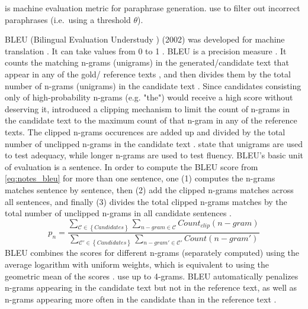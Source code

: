 \bluert{} is machine evaluation metric for paraphrase generation.
\citet{fu_learning_2024} use \bluert{} to filter out incorrect paraphrases (i.e.\ using a threshold $\theta$).

BLEU (Bilingual Evaluation Understudy \citep{palivela_optimization_2021,zhou_paraphrase_2025,papineni_bleu_2001}) (2002) 
was developed for machine translation \citep{zhou_paraphrase_2021,papineni_bleu_2001}.
It can take values from 0 to 1 \citep{papineni_bleu_2001}.
BLEU is a precision measure \citep{kurt_pehlivanoglu_comparative_2024,papineni_bleu_2001}.
It counts the matching n-grams (unigrams) in the generated/candidate text that appear in any of the gold/ reference texts \citep{palivela_optimization_2021,papineni_bleu_2001}, 
and then divides them by the total number of n-grams (unigrams) in the candidate text \citep{papineni_bleu_2001}.
Since candidates consisting only of high-probability n-grams (e.g. "the") would receive a high score without deserving it, 
\citet{papineni_bleu_2001} introduced a clipping mechanism to limit the count of n-grams in the candidate text to the maximum count of that n-gram in any of the reference texts.
The clipped n-grams occurences are added up and divided by the total number of unclipped n-grams in the candidate text \citep{papineni_bleu_2001}.
\citet{papineni_bleu_2001} state that unigrams are used to test adequacy, while longer n-grams are used to test fluency.
BLEU's basic unit of evaluation is a sentence. 
In order to compute the BLEU score from \autoref{eq:notes_bleu} for more than one sentence, one (1) computes the n-grams matches sentence by sentence, 
then (2) add the clipped n-grams matches across all sentences, 
and finally (3) divides the total clipped n-grams matches by the total number of unclipped n-grams in all candidate sentences \citep{papineni_bleu_2001}.
\begin{equation}
    p_n = \frac{\sum_{\mathcal{C} \in \left\{ Candidates \right\}}\sum_{n-gram \in\mathcal{C}}Count_{clip}(n-gram)}{\sum_{\mathcal{C'} \in \left\{ Candidates \right\}}\sum_{n-gram' \in\mathcal{C'}}Count(n-gram')}
\label{eq:notes_bleu}
\end{equation}
BLEU combines the scores for different n-grams (separately computed) using the average logarithm with uniform weights, 
which is equivalent to using the geometric mean of the scores \citep{papineni_bleu_2001,banerjee_METEOR_2005}.
\citet{gohsen_captions_2023} use up to 4-grams.
BLEU automatically penalizes n-grams appearing in the candidate text but not in the reference text, as well as n-grams appearing more often in the candidate than in the reference text \citep{papineni_bleu_2001}.
